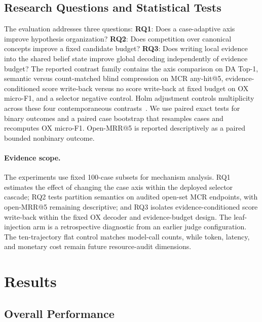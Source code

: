 \documentclass[letterpaper]{article} %
\begin{document}
\subsection{Research Questions and Statistical Tests}

The evaluation addresses three questions:
\textbf{RQ1}: Does a case-adaptive axis improve hypothesis organization?
\textbf{RQ2}: Does competition over canonical concepts improve a fixed candidate budget?
\textbf{RQ3}: Does writing local evidence into the shared belief state improve global decoding independently of evidence budget?
The reported contrast family contains the axis comparison on DA Top-1, semantic versus count-matched blind compression on MCR any-hit@5, evidence-conditioned score write-back versus no score write-back at fixed budget on OX micro-F1, and a selector negative control.
Holm adjustment controls multiplicity across these four contemporaneous contrasts~\cite{holm1979}.
We use paired exact tests for binary outcomes and a paired case bootstrap that resamples cases and recomputes OX micro-F1.
Open-MRR@5 is reported descriptively as a paired bounded nonbinary outcome.

\paragraph{Evidence scope.}
The experiments use fixed 100-case subsets for mechanism analysis.
RQ1 estimates the effect of changing the case axis within the deployed selector cascade; RQ2 tests partition semantics on audited open-set MCR endpoints, with open-MRR@5 remaining descriptive; and RQ3 isolates evidence-conditioned score write-back within the fixed OX decoder and evidence-budget design.
The leaf-injection arm is a retrospective diagnostic from an earlier judge configuration.
The ten-trajectory flat control matches model-call counts, while token, latency, and monetary cost remain future resource-audit dimensions.

\section{Results}
\label{sec:results}

\subsection{Overall Performance}
\label{sec:main-results}
\end{document}
